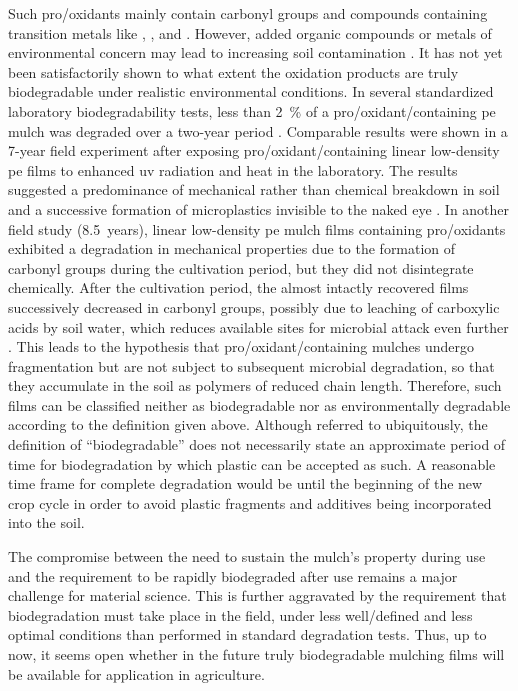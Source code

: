 Such pro\-/oxidants mainly contain carbonyl groups and compounds containing transition metals like , , and  \citep{KyrikouBiodegradation2007}. However, added organic compounds or metals of environmental concern may lead to increasing soil contamination \citep{KoutnyBiodegradation2006,Scarascia-MugnozzaPlastic2011}. It has not yet been satisfactorily shown to what extent the oxidation products are truly biodegradable under realistic environmental conditions. In several standardized laboratory biodegradability tests, less than \SI{2}{\percent} of a pro\-/oxidant\-/containing \ac{pe} mulch was degraded over a two-year period \citep{FeuilloleyDegradation2005}. Comparable results were shown in a \num{7}-year field experiment after exposing pro\-/oxidant\-/containing linear low-density \ac{pe} films to enhanced \ac{uv} radiation and heat in the laboratory. The results suggested a predominance of mechanical rather than chemical breakdown in soil and a successive formation of microplastics invisible to the naked eye \citep{BriassoulisDegradation2015}. In another field study (\num{8.5}~years), linear low-density \ac{pe} mulch films containing pro\-/oxidants exhibited a degradation in mechanical properties due to the formation of carbonyl groups during the cultivation period, but they did not disintegrate chemically. After the cultivation period, the almost intactly recovered films successively decreased in carbonyl groups, possibly due to leaching of carboxylic acids by soil water, which reduces available sites for microbial attack even further \citep{BriassoulisAnalysis2015}. This leads to the hypothesis that pro\-/oxidant\-/containing mulches undergo fragmentation but are not subject to subsequent microbial degradation, so that they accumulate in the soil as polymers of reduced chain length. Therefore, such films can be classified neither as biodegradable nor as environmentally degradable according to the definition given above. Although referred to ubiquitously, the definition of ``biodegradable'' does not necessarily state an approximate period of time for biodegradation by which plastic can be accepted as such. A reasonable time frame for complete degradation would be until the beginning of the new crop cycle in order to avoid plastic fragments and additives being incorporated into the soil.

The compromise between the need to sustain the mulch's property during use and the requirement to be rapidly biodegraded after use remains a major challenge for material science. This is further aggravated by the requirement that biodegradation must take place in the field, under less well\-/defined and less optimal conditions than performed in standard degradation tests. Thus, up to now, it seems open whether in the future truly biodegradable mulching films will be available for application in agriculture.

